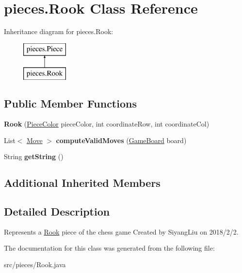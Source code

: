 \hypertarget{classpieces_1_1_rook}{}\section{pieces.\+Rook Class Reference}
\label{classpieces_1_1_rook}
Inheritance diagram for pieces.\+Rook\+:\begin{figure}[H]
\begin{center}
\leavevmode
\includegraphics[height=2.000000cm]{classpieces_1_1_rook}
\end{center}
\end{figure}
\subsection*{Public Member Functions}
\begin{DoxyCompactItemize}
\item 
\mbox{\label{classpieces_1_1_rook_a3bdcb3d2152c8b9370ee0d88a98e005d}} 
{\bfseries Rook} (\mbox{\hyperlink{enumpieces_1_1_piece_1_1_piece_color}{Piece\+Color}} piece\+Color, int coordinate\+Row, int coordinate\+Col)
\item 
\mbox{\label{classpieces_1_1_rook_ac41fa0491a74087d1b2309236fb755cc}} 
List$<$ \mbox{\hyperlink{classpieces_1_1_move}{Move}} $>$ {\bfseries compute\+Valid\+Moves} (\mbox{\hyperlink{classgameboard_1_1_game_board}{Game\+Board}} board)
\item 
\mbox{\label{classpieces_1_1_rook_a686b53b7dbb0dee50cd5a2e4557a8cb0}} 
String {\bfseries get\+String} ()
\end{DoxyCompactItemize}
\subsection*{Additional Inherited Members}


\subsection{Detailed Description}
Represents a \mbox{\hyperlink{classpieces_1_1_rook}{Rook}} piece of the chess game Created by Siyang\+Liu on 2018/2/2. 

The documentation for this class was generated from the following file\+:\begin{DoxyCompactItemize}
\item 
src/pieces/Rook.\+java\end{DoxyCompactItemize}
